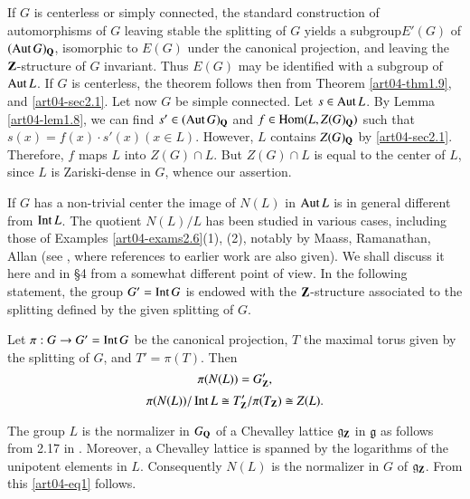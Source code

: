If $G$ is centerless or simply connected, the standard construction of automorphisms of $G$ leaving stable the splitting of $G$ yields a subgroup\pageoriginale $E'(G)$ of $(\operatorname{\mathrm{Aut}} G)_{\mathbf{Q}}$, isomorphic to $E(G)$ under the canonical projection, and leaving the $\mathbf{Z}$-structure of $G$ invariant. Thus $E(G)$ may be identified with a subgroup of $\operatorname{\mathrm{Aut}} L$. If $G$ is centerless, the theorem follows then from Theorem \ref{art04-thm1.9}, and \ref{art04-sec2.1}. Let now $G$ be simple connected. Let $s\in \operatorname{\mathrm{Aut}} L$. By Lemma \ref{art04-lem1.8}, we can find $s'\in (\operatorname{\mathrm{Aut}} G)_{\mathbf{Q}}$ and $f\in \operatorname{\mathrm{Hom}} (L,Z(G)_{\mathbf{Q}})$ such that $s(x)=f(x)\cdot s'(x)(x\in L)$. However, $L$ contains $Z(G)_{\mathbf{Q}}$ by \ref{art04-sec2.1}. Therefore, $f$ maps $L$ into $Z(G)\cap L$. But $Z(G)\cap L$ is equal to the center of $L$, since $L$ is Zariski-dense in $G$, whence our assertion.

If $G$ has a non-trivial center the image of $N(L)$ in $\operatorname{\mathrm{Aut}} L$ is in general different from $\operatorname{\mathrm{Int}} L$. The quotient $N(L)/L$ has been studied in various cases, including those of Examples \ref{art04-exams2.6}(1), (2), notably by Maass, Ramanathan, Allan (see \cite{art04-key1}, where references to earlier work are also given). We shall discuss it here and in \S4 from a somewhat different point of view. In the following statement, the group $G'=\operatorname{\mathrm{Int}} G$ is endowed with the $\mathbf{Z}$-structure associated to the splitting defined by the given splitting of $G$.

\begin{lemma}\label{art04-lem2.3}
Let $\pi:G\to G'=\operatorname{\mathrm{Int}} G$ be the canonical projection, $T$ the maximal torus given by the splitting of $G$, and $T'=\pi(T)$. Then
\begin{equation}
\pi(N(L))=G'_{\mathbf{Z}},\label{art04-eq1}
\end{equation}
\begin{equation}
\pi(N(L))/\operatorname{\mathrm{Int}} L\cong T'_{\mathbf{Z}}/\pi (T_{\mathbf{Z}})\cong Z(L).\label{art04-eq2}
\end{equation}
\end{lemma}

The group $L$ is the normalizer in $G_{\mathbf{Q}}$ of a Chevalley lattice $\mathfrak{g}_{\mathbf{Z}}$ in $\mathfrak{g}$ as follows from 2.17 in \cite{art04-key16}. Moreover, a Chevalley lattice is spanned by the logarithms of the unipotent elements in $L$. Consequently $N(L)$ is the normalizer in $G$ of $\mathfrak{g}_{\mathbf{Z}}$. From this \eqref{art04-eq1} follows.

